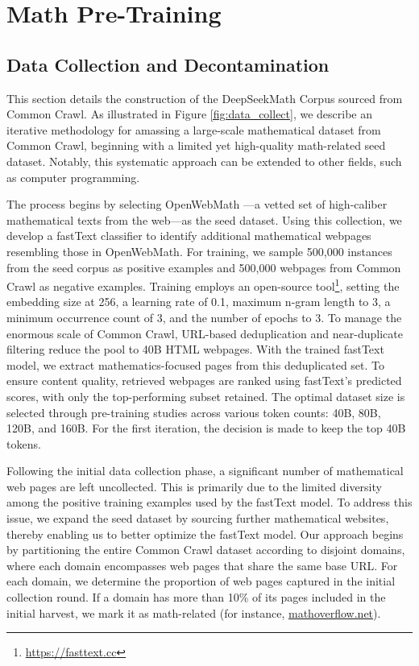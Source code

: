 \section{Math Pre-Training}

\subsection{Data Collection and Decontamination} This section details the construction of the DeepSeekMath Corpus sourced from Common Crawl. As illustrated in Figure \ref{fig:data_collect}, we describe an iterative methodology for amassing a large-scale mathematical dataset from Common Crawl, beginning with a limited yet high-quality math-related seed dataset. Notably, this systematic approach can be extended to other fields, such as computer programming.

The process begins by selecting OpenWebMath \citep{openwebmath}—a vetted set of high-caliber mathematical texts from the web—as the seed dataset. Using this collection, we develop a fastText classifier \citep{joulin2016fasttext} to identify additional mathematical webpages resembling those in OpenWebMath. For training, we sample 500,000 instances from the seed corpus as positive examples and 500,000 webpages from Common Crawl as negative examples. Training employs an open-source tool\footnote{\url{https://fasttext.cc}}, setting the embedding size at 256, a learning rate of 0.1, maximum n-gram length to 3, a minimum occurrence count of 3, and the number of epochs to 3. To manage the enormous scale of Common Crawl, URL-based deduplication and near-duplicate filtering reduce the pool to 40B HTML webpages. With the trained fastText model, we extract mathematics-focused pages from this deduplicated set. To ensure content quality, retrieved webpages are ranked using fastText’s predicted scores, with only the top-performing subset retained. The optimal dataset size is selected through pre-training studies across various token counts: 40B, 80B, 120B, and 160B. For the first iteration, the decision is made to keep the top 40B tokens.

Following the initial data collection phase, a significant number of mathematical web pages are left uncollected. This is primarily due to the limited diversity among the positive training examples used by the fastText model. To address this issue, we expand the seed dataset by sourcing further mathematical websites, thereby enabling us to better optimize the fastText model. Our approach begins by partitioning the entire Common Crawl dataset according to disjoint domains, where each domain encompasses web pages that share the same base URL. For each domain, we determine the proportion of web pages captured in the initial collection round. If a domain has more than 10\% of its pages included in the initial harvest, we mark it as math-related (for instance, \url{mathoverflow.net}).

